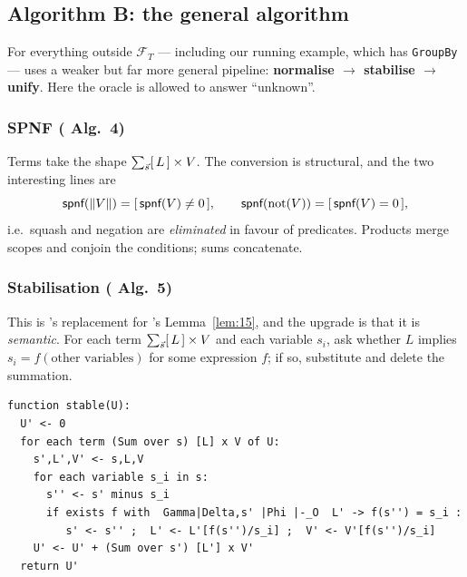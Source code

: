 
\subsection{Algorithm B: the general algorithm}
\label{sec:qed-general}

For everything outside $\mathcal F_T$ --- including our running example, which has
\texttt{GroupBy} --- \QED{} uses a weaker but far more general pipeline:
\textbf{normalise $\to$ stabilise $\to$ unify}. Here the oracle is allowed to answer
``unknown''.

\subsubsection{SPNF (\cite{qed} Alg.\ 4)}
Terms take the shape $\sum_{\vec s}[\,L\,]\times V$. The conversion is structural, and the
two interesting lines are
\[
\textsf{spnf}(\left\lVert V \right\rVert) = [\,\textsf{spnf}(V)\neq 0\,],
\qquad
\textsf{spnf}(\mathrm{not}(V)) = [\,\textsf{spnf}(V)=0\,],
\]
i.e.\ squash and negation are \emph{eliminated} in favour of predicates. Products merge
scopes and conjoin the conditions; sums concatenate.

\subsubsection{Stabilisation (\cite{qed} Alg.\ 5)}
\label{sec:stabilise}
This is \QED{}'s replacement for \udp{}'s Lemma~\ref{lem:15}, and the upgrade is that it is
\emph{semantic}. For each term $\sum_{\vec s}[\,L\,]\times V$ and each variable $s_i$, ask
whether $L$ implies $s_i = f(\text{other variables})$ for some expression $f$; if so,
substitute and delete the summation.

\begin{lstlisting}[style=pseudo]
function stable(U):
  U' <- 0
  for each term (Sum over s) [L] x V of U:
    s',L',V' <- s,L,V
    for each variable s_i in s:
      s'' <- s' minus s_i
      if exists f with  Gamma|Delta,s' |Phi |-_O  L' -> f(s'') = s_i :
         s' <- s'' ;  L' <- L'[f(s'')/s_i] ;  V' <- V'[f(s'')/s_i]
    U' <- U' + (Sum over s') [L'] x V'
  return U'
\end{lstlisting}

